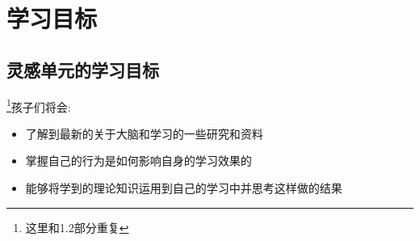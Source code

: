 \chapter{学习目标}


\section{灵感单元的学习目标}
\footnote{这里和1.2部分重复}孩子们将会:
      \begin{itemize}
        \item 了解到最新的关于大脑和学习的一些研究和资料
        \item 掌握自己的行为是如何影响自身的学习效果的
        \item 能够将学到的理论知识运用到自己的学习中并思考这样做的结果
      \end{itemize}  
 
